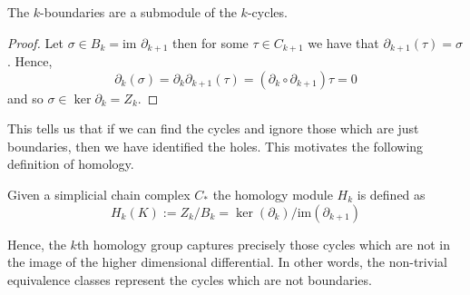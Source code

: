 \begin{corollary}
  The $k$-boundaries are a submodule of the $k$-cycles.
\end{corollary}


\begin{proof}
Let $\sigma \in B_{k} = \textrm{im } \partial_{k+1}$ then for some $\tau \in C_{k+1}$ we have that $\partial_{k+1}(\tau)=\sigma$. Hence,
\[ \partial_{k}(\sigma) = \partial_{k} \partial_{k+1}(\tau) = (\partial_{k} \circ \partial_{k+1}) \tau = 0\]
and so $\sigma \in \ker \partial_{k} = Z_{k}$.
\end{proof}

This tells us that if we can find the cycles and ignore those which are just boundaries, then we have identified the holes. This motivates the following definition of homology.
\begin{definition}
  Given a simplicial chain complex \hspace{0.05cm}$C_{*}$ the homology module $H_{k}$ is defined as
  \[H_{k}(K) := Z_{k} / B_{k} = \ker(\partial_{k})/\text{im}(\partial_{k+1})\]
\end{definition}
Hence, the $k$th homology group captures precisely those cycles which are not in the image of the higher dimensional differential. In other words, the non-trivial equivalence classes represent the cycles which are not boundaries.
